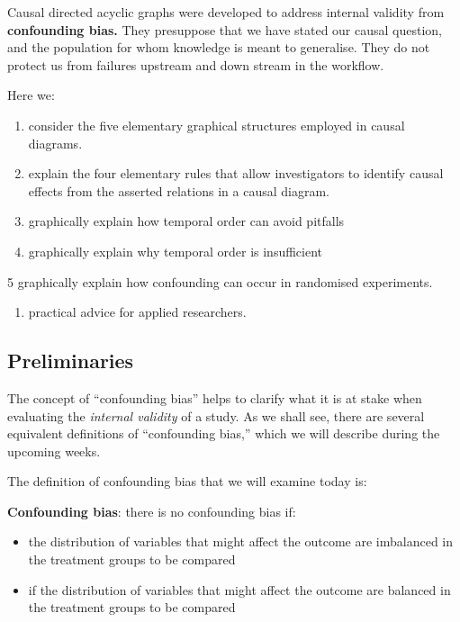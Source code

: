 \documentclass[
  single column]{article}
\providecommand{\tightlist}{%
  \setlength{\itemsep}{0pt}\setlength{\parskip}{0pt}}\usepackage{longtable,booktabs,array}
\begin{document}
Causal directed acyclic graphs were developed to address internal
validity from \textbf{confounding bias.} They presuppose that we have
stated our causal question, and the population for whom knowledge is
meant to generalise. They do not protect us from failures upstream and
down stream in the workflow.

Here we:

\begin{enumerate}
\def\labelenumi{\arabic{enumi}.}
\item
  consider the five elementary graphical structures employed in causal
  diagrams.
\item
  explain the four elementary rules that allow investigators to identify
  causal effects from the asserted relations in a causal diagram.
\item
  graphically explain how temporal order can avoid pitfalls
\item
  graphically explain why temporal order is insufficient
\end{enumerate}

5 graphically explain how confounding can occur in randomised
experiments.

\begin{enumerate}
\def\labelenumi{\arabic{enumi}.}
\setcounter{enumi}{5}
\tightlist
\item
  practical advice for applied researchers.
\end{enumerate}

\subsection{Preliminaries}\label{preliminaries}

The concept of ``confounding bias'' helps to clarify what it is at stake
when evaluating the \emph{internal validity} of a study. As we shall
see, there are several equivalent definitions of ``confounding bias,''
which we will describe during the upcoming weeks.

The definition of confounding bias that we will examine today is:

\textbf{Confounding bias}: there is no confounding bias if:

\begin{itemize}
\tightlist
\item
  the distribution of variables that might affect the outcome are
  imbalanced in the treatment groups to be compared
\item
  if the distribution of variables that might affect the outcome are
  balanced in the treatment groups to be compared
\end{itemize}
\end{document}
